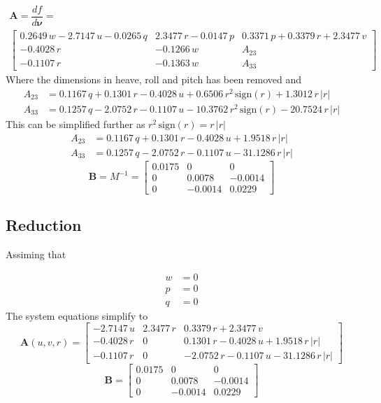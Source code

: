 \documentclass[12pt,a4]{article}
\begin{document}
\begin{multline}
	\bm{A} = \dfrac{df}{d\bm{\nu}}=	\\
	\left[\begin{array}{ccc} 0.2649\,w-2.7147\,u-0.0265\,q & 2.3477\,r-0.0147\,p & 0.3371\,p+0.3379\,r+2.3477\,v \\
			-0.4028\,r                          & -0.1266\,w          & A_{23}                        \\
			-0.1107\,r                          & -0.1363\,w          & A_{33}\end{array}\right]
\end{multline}
Where the dimensions in heave, roll and pitch has been removed and
\begin{align}
	A_{23} & = 0.1167\,q+0.1301\,r-0.4028\,u+0.6506\,r^2\,\mathrm{sign}\left(r\right)+1.3012\,r\,\left|r\right|   \\
	A_{33} & = 0.1257\,q-2.0752\,r-0.1107\,u-10.3762\,r^2\,\mathrm{sign}\left(r\right)-20.7524\,r\,\left|r\right|
\end{align}
This can be simplified further as $r^2 \,\mathrm{sign}(r) = r\,|r|$
\begin{align}
	A_{23} & = 0.1167\,q+0.1301\,r-0.4028\,u+	    1.9518\,r\,\left|r\right| \\
	A_{33} & = 0.1257\,q-2.0752\,r-0.1107\,u-	   31.1286\,r\,\left|r\right|
\end{align}
\begin{equation}
	\bm{B} = M^{-1} = \left[\begin{array}{ccc} 0.0175 & 0 & 0\\ 0 & 0.0078 & -0.0014\\ 0 & -0.0014 & 0.0229 \end{array}\right]
\end{equation}

\subsection{Reduction}

Assiming that

\begin{align*}
	w & = 0 \\
	p & = 0 \\
	q & = 0
\end{align*}
The system equations simplify to
\begin{equation}
	\bm{A}(u,v,r) = \left[\begin{array}{ccc} -2.7147\,u & 2.3477\,r & 0.3379\,r+2.3477\,v                             \\
			-0.4028\,r       & 0         & 0.1301\,r-0.4028\,u+			1.9518\,r\,\left|r\right|   \\
			-0.1107\,r       & 0         & -2.0752\,r-0.1107\,u-		31.1286\,r\,\left|r\right|\end{array}\right]
\end{equation}
\begin{equation}
	\bm{B} = \left[\begin{array}{ccc} 0.0175 & 0 & 0\\ 0 & 0.0078 & -0.0014\\ 0 & -0.0014 & 0.0229 \end{array}\right]
\end{equation}
\end{document}
